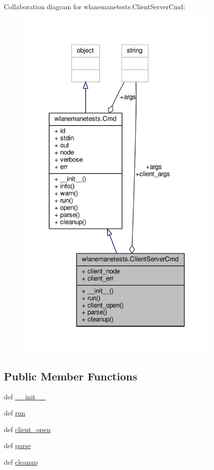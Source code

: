 Collaboration diagram for wlanemanetests.\+Client\+Server\+Cmd\+:
\nopagebreak
\begin{figure}[H]
\begin{center}
\leavevmode
\includegraphics[width=288pt]{classwlanemanetests_1_1_client_server_cmd__coll__graph}
\end{center}
\end{figure}
\subsection*{Public Member Functions}
\begin{DoxyCompactItemize}
\item 
def \hyperlink{classwlanemanetests_1_1_client_server_cmd_a6147b9c996e41c83f8ebbb81f5aee5be}{\+\_\+\+\_\+init\+\_\+\+\_\+}
\item 
def \hyperlink{classwlanemanetests_1_1_client_server_cmd_ac5c400fc3217b84d5e708486fe160bea}{run}
\item 
def \hyperlink{classwlanemanetests_1_1_client_server_cmd_a3c60da372a7c98838e9fdf0ce7a9e9cf}{client\+\_\+open}
\item 
def \hyperlink{classwlanemanetests_1_1_client_server_cmd_af9f71c30e89e355a343a6c1df78e599a}{parse}
\item 
def \hyperlink{classwlanemanetests_1_1_client_server_cmd_a10ed475cfd9e8db2e7cd52a0310af91b}{cleanup}
\end{DoxyCompactItemize}
